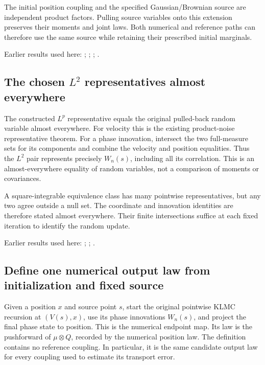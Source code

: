 \documentclass[11pt,a4paper]{report}
\begin{document}
The initial position coupling and the specified Gaussian/\allowbreak{}Brownian source are independent product factors. Pulling source variables onto this extension preserves their moments and joint laws. Both numerical and reference paths can therefore use the same source while retaining their prescribed initial marginals.



Earlier results used here: \cite[Section~3.17.1]{LangevinLean2026ULASC}; \cite[Section~3.22.2]{LangevinLean2026ULASC}; \cite[Section~3.22.3]{LangevinLean2026ULASC}; \cite[Section~3.23.4]{LangevinLean2026ULASC}.
\subsection{\texorpdfstring{The chosen \(L^{2}\) representatives almost everywhere}{The chosen L² representatives almost everywhere}}
\label{report-step-KineticLangevin-ProductLaw-lean-2}


The constructed \(L^p\) representative equals the original pulled-back random variable almost everywhere. For velocity this is the existing product-noise representative theorem. For a phase innovation, intersect the two full-measure sets for its components and combine the velocity and position equalities. Thus the \(L^{2}\) pair represents precisely \(W_n(s)\), including all its correlation. This is an almost-everywhere equality of random variables, not a comparison of moments or covariances.



A square-integrable equivalence class has many pointwise representatives, but any two agree outside a null set. The coordinate and innovation identities are therefore stated almost everywhere. Their finite intersections suffice at each fixed iteration to identify the random update.



Earlier results used here: \cite[Section~3.17.1]{LangevinLean2026ULASC}; \cite[Section~3.22.2]{LangevinLean2026ULASC}; \cite[Section~3.23.5]{LangevinLean2026ULASC}.
\subsection{\texorpdfstring{Define one numerical output law from initialization and fixed source}{Define one numerical output law from initialization and fixed source}}
\label{report-step-KineticLangevin-ProductLaw-lean-3}


Given a position \(x\) and source point \(s\), start the original pointwise KLMC recursion at \((V(s),x)\), use its phase innovations \(W_n(s)\), and project the final phase state to position. This is the numerical endpoint map. Its law is the pushforward of \(\mu\otimes Q\), recorded by the numerical position law. The definition contains no reference coupling. In particular, it is the same candidate output law for every coupling used to estimate its transport error.
\end{document}
